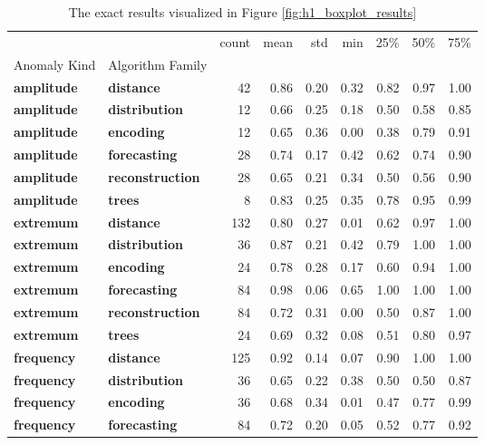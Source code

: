 \begin{table}
\caption{The exact results visualized in Figure \ref{fig:h1_boxplot_results}}
\label{tab:h1_boxplot_results}
\begin{tabular}{llrrrrrrr}
\toprule
 &  & count & mean & std & min & 25\% & 50\% & 75\% \\
Anomaly Kind & Algorithm Family &  &  &  &  &  &  &  \\
\midrule
\textbf{amplitude} & \textbf{distance} & 42 & 0.86 & 0.20 & 0.32 & 0.82 & 0.97 & 1.00 \\
\cline{1-9}
\textbf{amplitude} & \textbf{distribution} & 12 & 0.66 & 0.25 & 0.18 & 0.50 & 0.58 & 0.85 \\
\cline{1-9}
\textbf{amplitude} & \textbf{encoding} & 12 & 0.65 & 0.36 & 0.00 & 0.38 & 0.79 & 0.91 \\
\cline{1-9}
\textbf{amplitude} & \textbf{forecasting} & 28 & 0.74 & 0.17 & 0.42 & 0.62 & 0.74 & 0.90 \\
\cline{1-9}
\textbf{amplitude} & \textbf{reconstruction} & 28 & 0.65 & 0.21 & 0.34 & 0.50 & 0.56 & 0.90 \\
\cline{1-9}
\textbf{amplitude} & \textbf{trees} & 8 & 0.83 & 0.25 & 0.35 & 0.78 & 0.95 & 0.99 \\
\cline{1-9}
\textbf{extremum} & \textbf{distance} & 132 & 0.80 & 0.27 & 0.01 & 0.62 & 0.97 & 1.00 \\
\cline{1-9}
\textbf{extremum} & \textbf{distribution} & 36 & 0.87 & 0.21 & 0.42 & 0.79 & 1.00 & 1.00 \\
\cline{1-9}
\textbf{extremum} & \textbf{encoding} & 24 & 0.78 & 0.28 & 0.17 & 0.60 & 0.94 & 1.00 \\
\cline{1-9}
\textbf{extremum} & \textbf{forecasting} & 84 & 0.98 & 0.06 & 0.65 & 1.00 & 1.00 & 1.00 \\
\cline{1-9}
\textbf{extremum} & \textbf{reconstruction} & 84 & 0.72 & 0.31 & 0.00 & 0.50 & 0.87 & 1.00 \\
\cline{1-9}
\textbf{extremum} & \textbf{trees} & 24 & 0.69 & 0.32 & 0.08 & 0.51 & 0.80 & 0.97 \\
\cline{1-9}
\textbf{frequency} & \textbf{distance} & 125 & 0.92 & 0.14 & 0.07 & 0.90 & 1.00 & 1.00 \\
\cline{1-9}
\textbf{frequency} & \textbf{distribution} & 36 & 0.65 & 0.22 & 0.38 & 0.50 & 0.50 & 0.87 \\
\cline{1-9}
\textbf{frequency} & \textbf{encoding} & 36 & 0.68 & 0.34 & 0.01 & 0.47 & 0.77 & 0.99 \\
\cline{1-9}
\textbf{frequency} & \textbf{forecasting} & 84 & 0.72 & 0.20 & 0.05 & 0.52 & 0.77 & 0.92 \\

\end{tabular}
\end{table}
